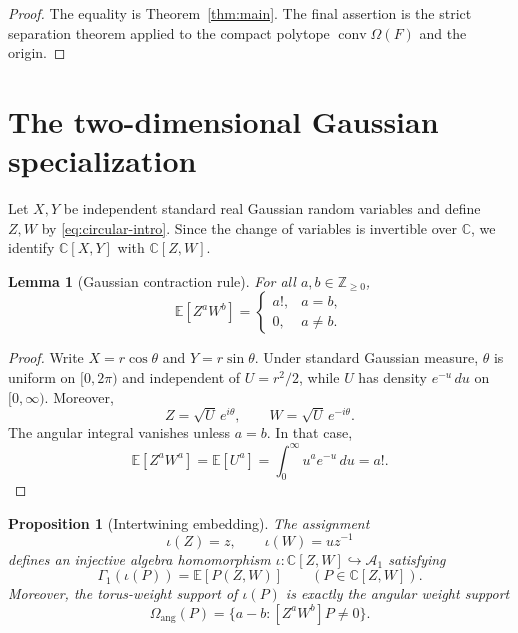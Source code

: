 \documentclass[11pt]{article}
\numberwithin{equation}{section}
\newtheorem{proposition}[theorem]{Proposition}
\newtheorem{lemma}[theorem]{Lemma}
\theoremstyle{definition}
\theoremstyle{remark}
\newcommand{\C}{\mathbb C}
\newcommand{\Z}{\mathbb Z}
\newcommand{\E}{\mathbb E}
\newcommand{\A}{\mathcal A}
\newcommand{\conv}{\operatorname{conv}}
\begin{document}
\begin{proof}
The equality is Theorem~\ref{thm:main}.  The final assertion is the strict
separation theorem applied to the compact polytope $\conv\Omega(F)$ and the
origin.
\end{proof}

\section{The two-dimensional Gaussian specialization}

Let $X,Y$ be independent standard real Gaussian random variables and define
$Z,W$ by \eqref{eq:circular-intro}.  Since the change of variables is
invertible over $\C$, we identify $\C[X,Y]$ with $\C[Z,W]$.

\begin{lemma}[Gaussian contraction rule]\label{lem:gaussian-contraction}
For all $a,b\in\Z_{\ge0}$,
\begin{equation}\label{eq:gaussian-contraction}
  \E[Z^aW^b]
  =\begin{cases}
     a!,&a=b,\\
     0,&a\ne b.
   \end{cases}
\end{equation}
\end{lemma}

\begin{proof}
Write $X=r\cos\theta$ and $Y=r\sin\theta$.  Under standard Gaussian
measure, $\theta$ is uniform on $[0,2\pi)$ and independent of
$U=r^2/2$, while $U$ has density $e^{-u}\,du$ on $[0,\infty)$.  Moreover,
\[
  Z=\sqrt U\,e^{i\theta},
  \qquad
  W=\sqrt U\,e^{-i\theta}.
\]
The angular integral vanishes unless $a=b$.  In that case,
\[
  \E[Z^aW^a]=\E[U^a]
  =\int_0^\infty u^ae^{-u}\,du=a!.
\]
\end{proof}

\begin{proposition}[Intertwining embedding]\label{prop:intertwining}
The assignment
\[
  \iota(Z)=z,
  \qquad
  \iota(W)=uz^{-1}
\]
defines an injective algebra homomorphism
$\iota:\C[Z,W]\hookrightarrow\A_1$ satisfying
\begin{equation}\label{eq:intertwining}
  \Gamma_1(\iota(P))=\E[P(Z,W)]
  \qquad(P\in\C[Z,W]).
\end{equation}
Moreover, the torus-weight support of $\iota(P)$ is exactly the angular
weight support
\[
  \Omega_{\mathrm{ang}}(P)
  =\{a-b:[Z^aW^b]P\ne0\}.
\]
\end{proposition}
\end{document}
